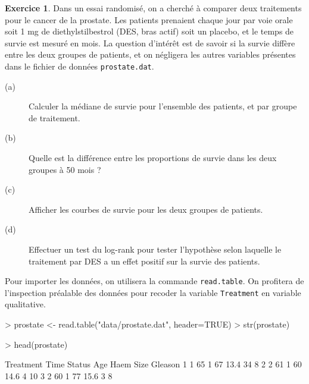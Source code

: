 \documentclass[11pt]{report}
\theoremstyle{definition}
\newtheorem{exo}{Exercice}[chapter]
\begin{document}
% 
%
\begin{exo}\label{exo:7.3}
Dans un essai randomisé, on a cherché à comparer deux traitements pour le
cancer de la prostate. Les patients prenaient chaque jour par voie orale
soit 1 mg de diethylstilbestrol (DES, bras actif) soit un placebo, et le
temps de survie est mesuré en mois.\autocite{collett94} La question
d'intérêt est de savoir si la survie diffère entre les deux groupes de
patients, et on négligera les autres variables présentes dans le fichier de
données \texttt{prostate.dat}. 
\begin{description}
\item[(a)] Calculer la médiane de survie pour l'ensemble des patients, et
  par groupe de traitement.
\item[(b)] Quelle est la différence entre les proportions de survie dans les
  deux groupes à 50 mois ?
\item[(c)] Afficher les courbes de survie pour les deux groupes de patients.
\item[(d)] Effectuer un test du log-rank pour tester l'hypothèse selon
  laquelle le traitement par DES a un effet positif sur la survie des
  patients. 
\end{description}
\begin{sol}
Pour importer les données, on utilisera la commande \texttt{read.table}. On
profitera de l'inspection préalable des données pour recoder la variable
\texttt{Treatment} en variable qualitative.
\begin{Schunk}
\begin{Sinput}
> prostate <- read.table("data/prostate.dat", header=TRUE)
> str(prostate)
\end{Sinput}
\begin{Sinput}
> head(prostate)
\end{Sinput}
\begin{Soutput}
  Treatment Time Status Age Haem Size Gleason
1         1   65      1  67 13.4   34       8
2         2   61      1  60 14.6    4      10
3         2   60      1  77 15.6    3       8

\end{Soutput}
\end{Schunk}
\end{sol}
\end{exo}
\end{document}
